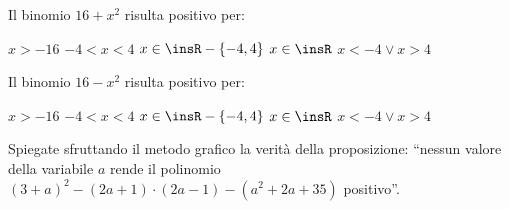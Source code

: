 \begin{esercizio}
\label{ese:4.24}
Il binomio $16+x^2$ risulta positivo per:

\boxA\; $x>-16$\quad \boxB\; $-4<x<4$ \quad\boxC\; $x\in \insR-\{-4,4\}$ 
\quad\boxD\; $x\in \insR$ \quad\boxE\; $x<-4\vee x>4$
\end{esercizio}

\begin{esercizio}
\label{ese:4.25}
Il binomio $16-x^2$ risulta positivo per:

\boxA\; $x>-16$\quad \boxB\; $-4<x<4$ \quad\boxC\; $x\in \insR-\{-4,4\}$ 
\quad\boxD\; $x\in \insR$ \quad\boxE\; $x<-4\vee x>4$
\end{esercizio}

\begin{esercizio}
 \label{ese:4.26}
Spiegate sfruttando il metodo grafico la verità della proposizione: ``nessun 
valore della variabile $a$ rende il polinomio $(3+a)^2-(2a+1)\cdot 
(2a-1)-(a^2+2a+35)$ positivo''.
\end{esercizio}

